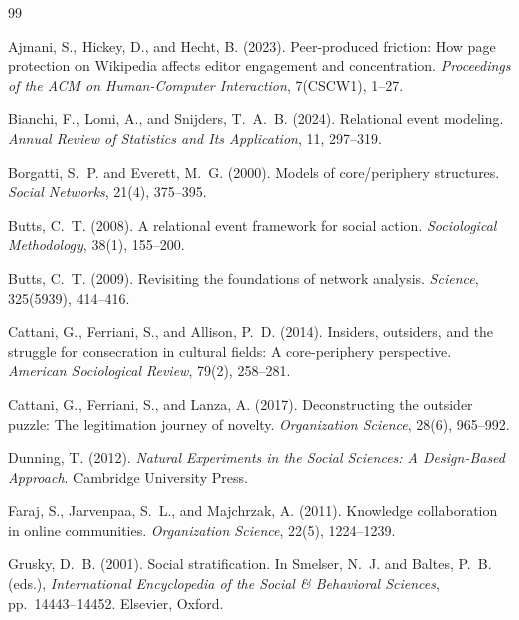 \documentclass[11pt]{article}
\begin{document}
\renewcommand{\refname}{References}
\begin{thebibliography}{99}
\setlength{\itemsep}{2pt}
\setlength{\parskip}{0pt}

Ajmani, S., Hickey, D., and Hecht, B. (2023).
\newblock Peer-produced friction: How page protection on {W}ikipedia affects editor engagement and concentration.
\newblock \emph{Proceedings of the ACM on Human-Computer Interaction}, 7(CSCW1), 1--27.

Bianchi, F., Lomi, A., and Snijders, T.~A.~B. (2024).
\newblock Relational event modeling.
\newblock \emph{Annual Review of Statistics and Its Application}, 11, 297--319.

Borgatti, S.~P. and Everett, M.~G. (2000).
\newblock Models of core/periphery structures.
\newblock \emph{Social Networks}, 21(4), 375--395.

Butts, C.~T. (2008).
\newblock A relational event framework for social action.
\newblock \emph{Sociological Methodology}, 38(1), 155--200.

Butts, C.~T. (2009).
\newblock Revisiting the foundations of network analysis.
\newblock \emph{Science}, 325(5939), 414--416.

Cattani, G., Ferriani, S., and Allison, P.~D. (2014).
\newblock Insiders, outsiders, and the struggle for consecration in cultural fields: A core-periphery perspective.
\newblock \emph{American Sociological Review}, 79(2), 258--281.

Cattani, G., Ferriani, S., and Lanza, A. (2017).
\newblock Deconstructing the outsider puzzle: The legitimation journey of novelty.
\newblock \emph{Organization Science}, 28(6), 965--992.

Dunning, T. (2012).
\newblock \emph{Natural Experiments in the Social Sciences: A Design-Based Approach}.
\newblock Cambridge University Press.

Faraj, S., Jarvenpaa, S.~L., and Majchrzak, A. (2011).
\newblock Knowledge collaboration in online communities.
\newblock \emph{Organization Science}, 22(5), 1224--1239.

Grusky, D.~B. (2001).
\newblock Social stratification.
\newblock In Smelser, N.~J. and Baltes, P.~B. (eds.), \emph{International Encyclopedia of the Social \& Behavioral Sciences}, pp.~14443--14452. Elsevier, Oxford.


\end{thebibliography}
\end{document}
